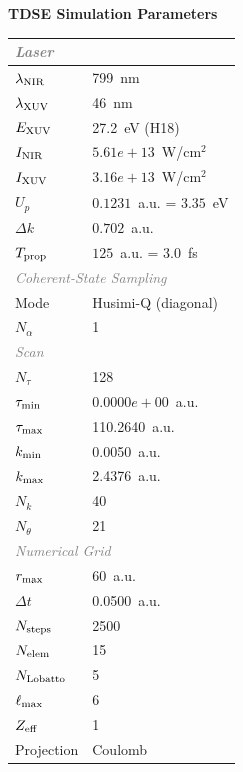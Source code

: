 \documentclass[11pt]{article}
\begin{document}

\begin{center}
  \Large\textbf{TDSE Simulation Parameters}
\end{center}
\vspace{4pt}

\begin{tabular}{@{}ll@{}}
  \toprule
  \multicolumn{2}{l}{\small\textit{\textcolor{gray}{Laser}}} \\
  \hline
  $\lambda_{\rm NIR}$ & 799~nm \\
  $\lambda_{\rm XUV}$ & 46~nm \\
  $E_{\rm XUV}$ & 27.2~eV (H18) \\
  $I_{\rm NIR}$ & $5.61e+13$~W/cm$^2$ \\
  $I_{\rm XUV}$ & $3.16e+13$~W/cm$^2$ \\
  $U_p$ & $0.1231$~a.u. = $3.35$~eV \\
  $\Delta k$ & $0.702$~a.u. \\
  $T_{\rm prop}$ & $125$~a.u. = $3.0$~fs \\
  \multicolumn{2}{l}{\small\textit{\textcolor{gray}{Coherent-State Sampling}}} \\
  \hline
  Mode & Husimi-Q (diagonal) \\
  $N_{\alpha}$ & 1 \\
  \multicolumn{2}{l}{\small\textit{\textcolor{gray}{Scan}}} \\
  \hline
  $N_{\tau}$ & 128 \\
  $\tau_{\rm min}$ & $0.0000e+00$~a.u. \\
  $\tau_{\rm max}$ & 110.2640~a.u. \\
  $k_{\rm min}$ & 0.0050~a.u. \\
  $k_{\rm max}$ & 2.4376~a.u. \\
  $N_k$ & 40 \\
  $N_{\theta}$ & 21 \\
  \multicolumn{2}{l}{\small\textit{\textcolor{gray}{Numerical Grid}}} \\
  \hline
  $r_{\rm max}$ & 60~a.u. \\
  $\Delta t$ & 0.0500~a.u. \\
  $N_{\rm steps}$ & 2500 \\
  $N_{\rm elem}$ & 15 \\
  $N_{\rm Lobatto}$ & 5 \\
  $\ell_{\rm max}$ & 6 \\
  $Z_{\rm eff}$ & 1 \\
  Projection & Coulomb \\
  \bottomrule
\end{tabular}
\end{document}
